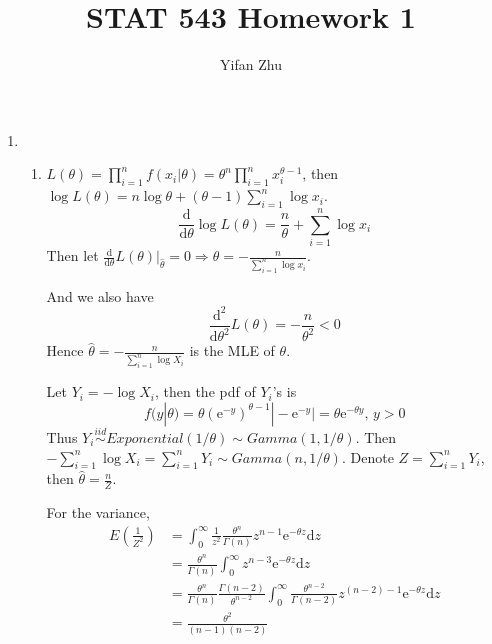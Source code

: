 \documentclass{article}
\begin{document}
	

	
	\title{STAT 543 Homework 1}
	\author{Yifan Zhu}
	\maketitle
	
	\begin{enumerate}[leftmargin = 0 em, label = \arabic*., font = \bfseries]
	\item 
	\begin{enumerate}
		\item 
		$L(\theta) = \prod_{i=1}^n f(x_i | \theta) = \theta^n \prod_{i=1}^n x_i^{\theta - 1}$, then $\log L(\theta) = n \log \theta + (\theta - 1) \sum_{i=1}^n \log x_i$.
		\[\frac{\mathrm{d}}{\mathrm{d}\theta} \log L(\theta) = \frac{n}{\theta} + \sum_{i=1}^n \log x_i\]
		Then let $\frac{\mathrm{d}}{\mathrm{d}\theta} L(\theta)\big|_{\hat{\theta}} = 0 \Rightarrow \hat{\theta} = -\frac{n}{\sum_{i=1}^n \log x_i}$.

		And we also have 
		\[\frac{\mathrm{d^2}}{\mathrm{d}\theta^2} L(\theta) = -\frac{n}{\theta^2} < 0\]
		Hence $\hat{\theta} = -\frac{n}{\sum_{i=1}^n \log X_i}$ is the MLE of $\theta$.

		Let $Y_i = -\log X_i$, then the pdf of $Y_i$'s is
		\[f(y|\theta) = \theta (\mathrm{e}^{-y})^{\theta - 1} |- \mathrm{e}^{-y}| = \theta \mathrm{e}^{-\theta y},\, y > 0\]
		Thus $Y_i \overset{iid}{\sim} Exponential(1/\theta) \sim Gamma(1, 1/\theta)$. Then $-\sum_{i=1}^n \log X_i = \sum_{i=1}^n Y_i \sim Gamma(n, 1/\theta)$. Denote $Z = \sum_{i=1}^n Y_i$, then $\hat{\theta} = \frac{n}{Z}$.

		For the variance,
		\begin{align*}
		E(\frac{1}{Z^2}) & = \int_{0}^\infty \frac{1}{z^2} \frac{\theta^n}{\Gamma(n)} z^{n-1} \mathrm{e}^{-\theta z} \mathrm{d}z\\
		& = \frac{\theta^n}{\Gamma(n)} \int_{0}^\infty z^{n-3} \mathrm{e}^{-\theta z} \mathrm{d}z\\
		& = \frac{\theta^n}{\Gamma(n)} \frac{\Gamma(n-2)}{\theta^{n-2}} \int_{0}^\infty \frac{\theta^{n-2}}{\Gamma(n-2)} z^{(n-2)-1} \mathrm{e}^{-\theta z} \mathrm{d}z\\
		& = \frac{\theta^2}{(n-1)(n-2)}
		\end{align*}


\end{enumerate}
\end{enumerate}
\end{document}

